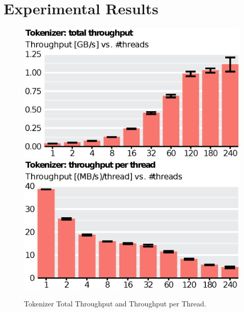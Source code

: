
\section{Experimental Results}\label{sec:exp}

\begin{figure}
    \includegraphics[scale=.45]{img/def/tokenizer_tp_total.eps}
    \includegraphics[scale=.45]{img/def/tokenizer_tp_per_thread.eps}
    \caption{Tokenizer Total Throughput and Throughput per Thread.}%
    \label{fig:tokenizertp}
\end{figure}


